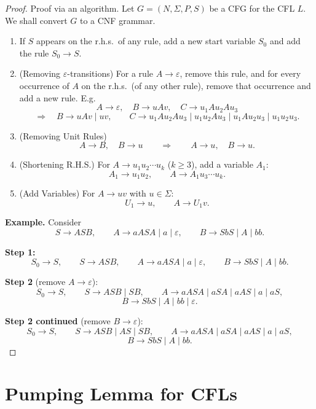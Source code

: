 \begin{proof}
Proof via an algorithm. Let $G = (N, \Sigma, P, S)$ be a CFG for the CFL $L$. We shall convert $G$ to a CNF grammar.

\begin{enumerate}[1.]
    \item If $S$ appears on the r.h.s.\ of any rule, add a new start variable $S_0$ and add the rule $S_0 \to S$.

    \item (Removing $\varepsilon$-transitions) For a rule $A \to \varepsilon$, remove this rule, and for every occurrence of $A$ on the r.h.s.\ (of any other rule), remove that occurrence and add a new rule. E.g.
    \[
    A \to \varepsilon, \quad B \to uAv, \quad C \to u_1 A u_2 A u_3
    \]
    \[
    \Longrightarrow \quad B \to uAv \mid uv, \qquad C \to u_1Au_2Au_3 \mid u_1u_2Au_3 \mid u_1Au_2u_3 \mid u_1u_2u_3.
    \]

    \item (Removing Unit Rules)
    \[
    A \to B, \quad B \to u \qquad \Longrightarrow \qquad A \to u, \quad B \to u.
    \]

    \item (Shortening R.H.S.) For $A \to u_1 u_2 \cdots u_k$ ($k \geq 3$), add a variable $A_1$:
    \[
    A_1 \to u_1 u_2, \qquad A \to A_1 u_3 \cdots u_k.
    \]

    \item (Add Variables) For $A \to uv$ with $u \in \Sigma$:
    \[
    U_1 \to u, \qquad A \to U_1 v.
    \]
\end{enumerate}

\medskip
\noindent\textbf{Example.} Consider
\[
S \to ASB, \qquad A \to aASA \mid a \mid \varepsilon, \qquad B \to SbS \mid A \mid bb.
\]

\medskip
\noindent\textbf{Step 1:}
\[
S_0 \to S, \qquad S \to ASB, \qquad A \to aASA \mid a \mid \varepsilon, \qquad B \to SbS \mid A \mid bb.
\]

\medskip
\noindent\textbf{Step 2} (remove $A \to \varepsilon$):
\[
S_0 \to S, \qquad S \to ASB \mid SB, \qquad A \to aASA \mid aSA \mid aAS \mid a \mid aS,
\]
\[
B \to SbS \mid A \mid bb \mid \varepsilon.
\]

\medskip
\noindent\textbf{Step 2 continued} (remove $B \to \varepsilon$):
\[
S_0 \to S, \qquad S \to ASB \mid AS \mid SB, \qquad A \to aASA \mid aSA \mid aAS \mid a \mid aS,
\]
\[
B \to SbS \mid A \mid bb.
\]
\end{proof}

\section{Pumping Lemma for CFLs}

